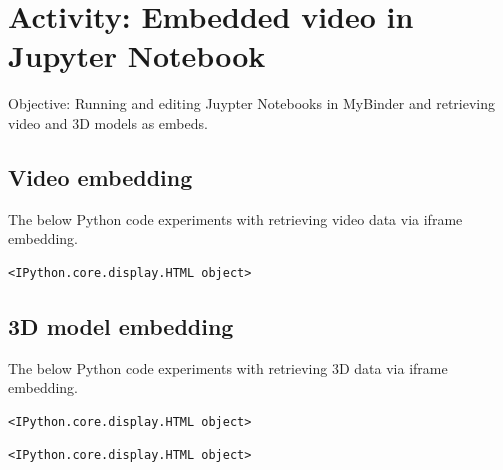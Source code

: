 \documentclass[
  letterpaper,
]{book}
\begin{document}

\hypertarget{activity-embedded-video-in-jupyter-notebook}{%
\chapter{Activity: Embedded video in Jupyter
Notebook}\label{activity-embedded-video-in-jupyter-notebook}}

Objective: Running and editing Juypter Notebooks in MyBinder and
retrieving video and 3D models as embeds.

\hypertarget{video-embedding}{%
\section{Video embedding}\label{video-embedding}}

The below Python code experiments with retrieving video data via iframe
embedding.

\begin{verbatim}
<IPython.core.display.HTML object>
\end{verbatim}

\hypertarget{d-model-embedding}{%
\section{3D model embedding}\label{d-model-embedding}}

The below Python code experiments with retrieving 3D data via iframe
embedding.

\begin{verbatim}
<IPython.core.display.HTML object>
\end{verbatim}

\begin{verbatim}
<IPython.core.display.HTML object>
\end{verbatim}


\backmatter
\end{document}
